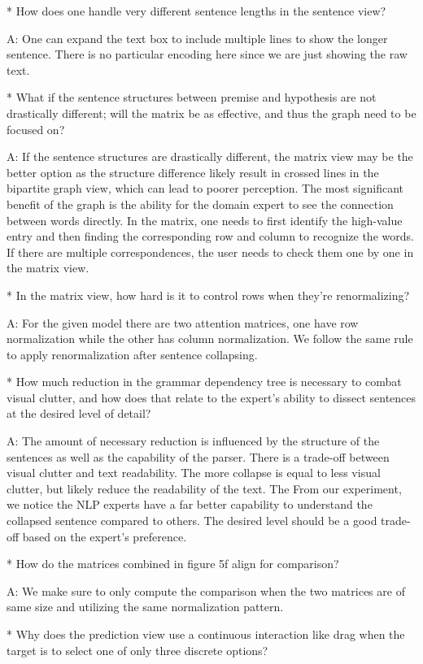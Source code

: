 * How does one handle very different sentence lengths in the sentence view?

A: One can expand the text box to include multiple lines to show the longer sentence. There is no particular encoding here since we are just showing the raw text.

* What if the sentence structures between premise and hypothesis are not drastically different; will the matrix be as effective, and thus the graph need to be focused on?

A: If the sentence structures are drastically different, the matrix view may be the better option as the structure difference likely result in crossed lines in the bipartite graph view, which can lead to poorer perception. The most significant benefit of the graph is the ability for the domain expert to see the connection between words directly. In the matrix, one needs to first identify the high-value entry and then finding the corresponding row and column to recognize the words. If there are multiple correspondences, the user needs to check them one by one in the matrix view.

* In the matrix view, how hard is it to control rows when they're renormalizing?

A: For the given model there are two attention matrices, one have row normalization while the other has column normalization. We follow the same rule to apply renormalization after sentence collapsing.

* How much reduction in the grammar dependency tree is necessary to combat visual clutter, and how does that relate to the expert's ability to dissect sentences at the desired level of detail?

A: The amount of necessary reduction is influenced by the structure of the sentences as well as the capability of the parser. There is a trade-off between visual clutter and text readability. The more collapse is equal to less visual clutter, but likely reduce the readability of the text. The From our experiment, we notice the NLP experts have a far better capability to understand the collapsed sentence compared to others. The desired level should be a good trade-off based on the expert's preference.

* How do the matrices combined in figure 5f align for comparison?

A: We make sure to only compute the comparison when the two matrices are of same size and utilizing the same normalization pattern.

* Why does the prediction view use a continuous interaction like drag when the target is to select one of only three discrete options?

